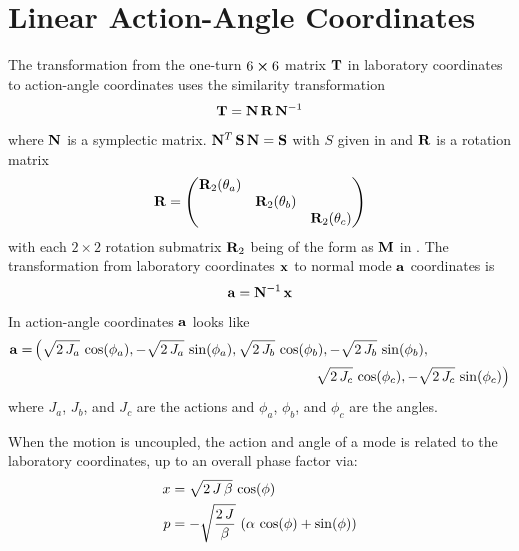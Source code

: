 \section{Linear Action-Angle Coordinates}
\label{s:action.ang}

The transformation from the one-turn $6 \mathbin{\boldsymbol{\times}} 6$ matrix ${\bf T}$ in laboratory coordinates to
action-angle coordinates uses the similarity transformation
\begin{equation}
  {\bf T} = {\bf N} \, {\bf R} \, {\bf N}^{-1}
\end{equation}
where ${\bf N}$ is a symplectic matrix. ${\bf N}^T \, {\bf S} \, {\bf N} = {\bf S}$ with $S$ given in 
and ${\bf R}$ is a rotation matrix
\begin{equation}
  {\bf R} = \begin{pmatrix}
    {\bf R}_2(\theta_a) &                  &                  \\
                     & {\bf R}_2(\theta_b) &                  \\
                     &                  & {\bf R}_2(\theta_c)
  \end{pmatrix}
\end{equation}
with each $2 \times 2$ rotation submatrix ${\bf R}_2$ being of the form as ${\bf M}$ in .
The transformation from laboratory coordinates ${\bf x}$ to normal mode ${\bf a}$ coordinates is
\begin{equation}
  {\bf a} = {\bf N}^{-1} \, {\bf x}
\end{equation}
In action-angle coordinates ${\bf a}$ looks like
\begin{align}
  \bfa = &\left( \sqrt{2 \, J_a} \, \cos(\phi_a), -\sqrt{2 \, J_a} \, \sin(\phi_a), 
                 \sqrt{2 \, J_b} \, \cos(\phi_b), -\sqrt{2 \, J_b} \, \sin(\phi_b), \right. \\
        &\hskip20em \left. 
                 \sqrt{2 \, J_c} \, \cos(\phi_c), -\sqrt{2 \, J_c} \, \sin(\phi_c) 
         \right) \nonumber
\end{align}
where $J_a$, $J_b$, and $J_c$ are the actions and $\phi_a$, $\phi_b$, and $\phi_c$ are the angles.

When the motion is uncoupled, the action and angle of a mode is related to the laboratory coordinates, up
to an overall phase factor via:
\begin{align}
  x &= \sqrt{2 \, J \, \beta} \, \cos( \phi ) \nonumber \\
  p &= -\sqrt{\frac{2 \, J}{\beta}} \, \left( \alpha \, \cos( \phi ) + \sin( \phi ) \right) \nonumber \\
\end{align}

